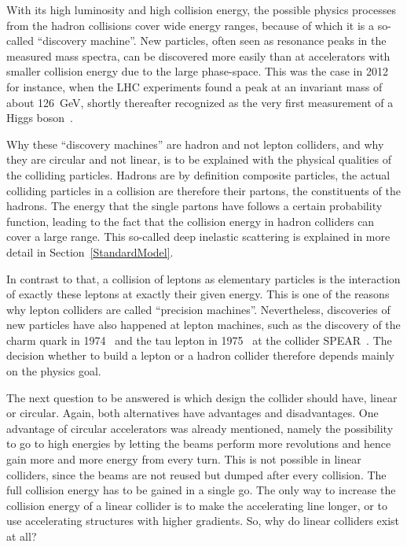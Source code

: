 With its high luminosity and high collision energy, the possible physics processes from the hadron collisions cover wide energy ranges, because of which it is a so-called ``discovery machine''.
New particles, often seen as resonance peaks in the measured mass spectra, can be discovered more easily than at accelerators with smaller collision energy due to the large phase-space.
This was the case in 2012 for instance, when the LHC experiments found a peak at an invariant mass of about \SI{126}{\GeV}, shortly thereafter recognized as the very first measurement of a Higgs boson~\cite{Higgs,Higgs2}.

Why these ``discovery machines'' are hadron and not lepton colliders, and why they are circular and not linear, is to be explained with the physical qualities of the colliding particles.
Hadrons are by definition composite particles, the actual colliding particles in a collision are therefore their partons, the constituents of the hadrons.
The energy that the single partons have follows a certain probability function, leading to the fact that the collision energy in hadron colliders can cover a large range.
This so-called deep inelastic scattering is explained in more detail in Section~\ref{StandardModel}.

In contrast to that, a collision of leptons as elementary particles is the interaction of exactly these leptons at exactly their given energy.
This is one of the reasons why lepton colliders are called ``precision machines''.
Nevertheless, discoveries of new particles have also happened at lepton machines, such as the discovery of the charm quark in 1974~\cite{charm} and the tau lepton in 1975~\cite{tau} at the \positron\electron collider SPEAR~\cite{SPEAR}.
The decision whether to build a lepton or a hadron collider therefore depends mainly on the physics goal.

The next question to be answered is which design the collider should have, linear or circular.
Again, both alternatives have advantages and disadvantages.
One advantage of circular accelerators was already mentioned, namely the possibility to go to high energies by letting the beams perform more revolutions and hence gain more and more energy from every turn.
This is not possible in linear colliders, since the beams are not reused but dumped after every collision.
The full collision energy has to be gained in a single go.
The only way to increase the collision energy of a linear collider is to make the accelerating line longer, or to use accelerating structures with higher gradients.
So, why do linear colliders exist at all?

